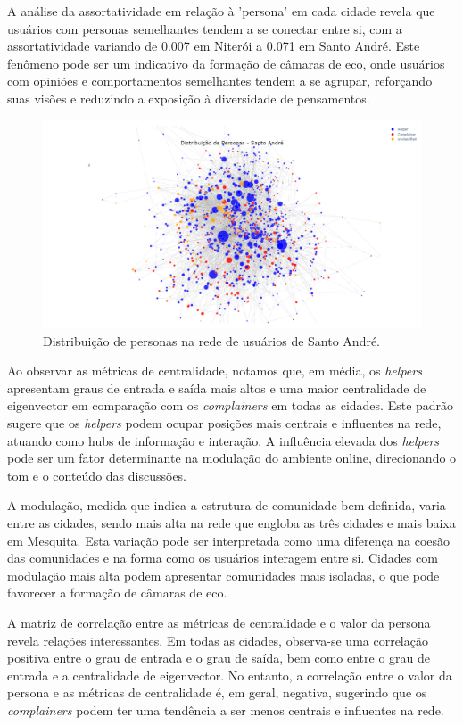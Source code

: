 A análise da assortatividade em relação à 'persona' em cada cidade revela que usuários com personas semelhantes tendem a se conectar entre si, com a assortatividade variando de 0.007 em Niterói a 0.071 em Santo André. Este fenômeno pode ser um indicativo da formação de câmaras de eco, onde usuários com opiniões e comportamentos semelhantes tendem a se agrupar, reforçando suas visões e reduzindo a exposição à diversidade de pensamentos.

\begin{figure}[h]
    \centering
    \includegraphics[width=1\textwidth]{images/network_personas_sandre.png}
    \caption{Distribuição de personas na rede de usuários de Santo André.}
    \label{fig:network_personas_sandre}
\end{figure}

Ao observar as métricas de centralidade, notamos que, em média, os \textit{helpers} apresentam graus de entrada e saída mais altos e uma maior centralidade de eigenvector em comparação com os \textit{complainers} em todas as cidades. Este padrão sugere que os \textit{helpers} podem ocupar posições mais centrais e influentes na rede, atuando como hubs de informação e interação. A influência elevada dos \textit{helpers} pode ser um fator determinante na modulação do ambiente online, direcionando o tom e o conteúdo das discussões.

A modulação, medida que indica a estrutura de comunidade bem definida, varia entre as cidades, sendo mais alta na rede que engloba as três cidades e mais baixa em Mesquita. Esta variação pode ser interpretada como uma diferença na coesão das comunidades e na forma como os usuários interagem entre si. Cidades com modulação mais alta podem apresentar comunidades mais isoladas, o que pode favorecer a formação de câmaras de eco.

A matriz de correlação entre as métricas de centralidade e o valor da persona revela relações interessantes. Em todas as cidades, observa-se uma correlação positiva entre o grau de entrada e o grau de saída, bem como entre o grau de entrada e a centralidade de eigenvector. No entanto, a correlação entre o valor da persona e as métricas de centralidade é, em geral, negativa, sugerindo que os \textit{complainers} podem ter uma tendência a ser menos centrais e influentes na rede.

